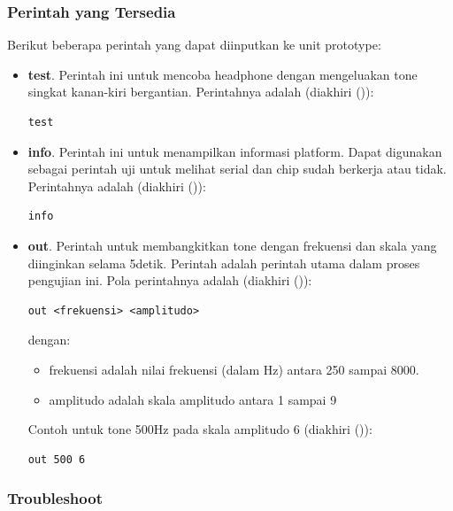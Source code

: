 \documentclass[12pt,]{article}
\begin{document}
	\subsubsection{Perintah yang Tersedia}
	
	Berikut beberapa perintah yang dapat diinputkan ke unit prototype:
	
	\begin{itemize}
		\item \textbf{test}.
		Perintah ini untuk mencoba headphone dengan mengeluakan tone singkat kanan-kiri bergantian.
		Perintahnya adalah (diakhiri (\keys{\return})):
		\begin{verbatim}
test
		\end{verbatim}
		
		\item \textbf{info}.
		Perintah ini untuk menampilkan informasi platform.
		Dapat digunakan sebagai perintah uji untuk melihat serial dan chip sudah berkerja atau tidak.
		Perintahnya adalah (diakhiri (\keys{\return})):
		\begin{verbatim}
info
		\end{verbatim}
		
		\item \textbf{out}.
		Perintah untuk membangkitkan tone dengan frekuensi dan skala yang diinginkan selama 5detik.
		Perintah adalah perintah utama dalam proses pengujian ini.
		Pola perintahnya adalah (diakhiri (\keys{\return})):
		\begin{verbatim}
out <frekuensi> <amplitudo>
		\end{verbatim}
		dengan:
		\begin{itemize}
			\item frekuensi adalah nilai frekuensi (dalam Hz) antara 250 sampai 8000.
			\item amplitudo adalah skala amplitudo antara 1 sampai 9
		\end{itemize}
		Contoh untuk tone 500Hz pada skala amplitudo 6 (diakhiri (\keys{\return})):
		\begin{verbatim}
out 500 6
		\end{verbatim}
	\end{itemize}

	\newpage
	\subsubsection{Troubleshoot}
	
\end{document}
